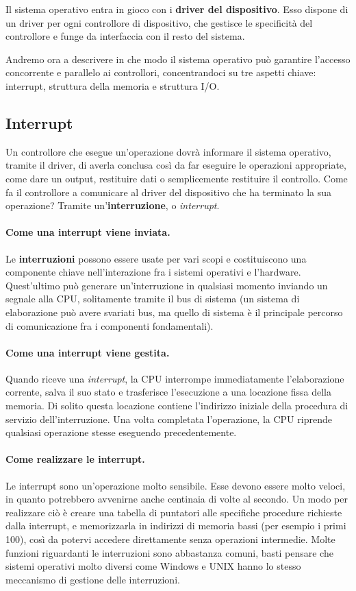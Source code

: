     Il sistema operativo entra in gioco con i \textbf{driver del dispositivo}. Esso dispone di un driver per ogni controllore di dispositivo, che gestisce le specificità del controllore e funge da interfaccia con il resto del sistema.
    
    Andremo ora a descrivere in che modo il sistema operativo può garantire l'accesso concorrente e parallelo ai controllori, concentrandoci su tre aspetti chiave: interrupt, struttura della memoria e struttura I/O.
    
    \subsection{Interrupt}
        Un controllore che esegue un'operazione dovrà informare il sistema operativo, tramite il driver, di averla conclusa così da far eseguire le operazioni appropriate, come dare un output, restituire dati o semplicemente restituire il controllo. Come fa il controllore a comunicare al driver del dispositivo che ha terminato la sua operazione? Tramite un'\textbf{interruzione}, o \textit{interrupt}.
        
        
        \paragraph{Come una interrupt viene inviata.} Le \textbf{interruzioni} possono essere usate per vari scopi e costituiscono una componente chiave nell'interazione fra i sistemi operativi e l'hardware. Quest'ultimo può generare un'interruzione in qualsiasi momento inviando un segnale alla CPU, solitamente tramite il bus di sistema (un sistema di elaborazione può avere svariati bus, ma quello di sistema è il principale percorso di comunicazione fra i componenti fondamentali).
        
        \paragraph{Come una interrupt viene gestita.} Quando riceve una \textit{interrupt}, la CPU interrompe immediatamente l'elaborazione corrente, salva il suo stato e trasferisce l'esecuzione a una locazione fissa della memoria. Di solito questa locazione contiene l'indirizzo iniziale della procedura di servizio dell'interruzione. Una volta completata l'operazione, la CPU riprende qualsiasi operazione stesse eseguendo precedentemente.
        
        \paragraph{Come realizzare le interrupt.} Le interrupt sono un'operazione molto sensibile. Esse devono essere molto veloci, in quanto potrebbero avvenirne anche centinaia di volte al secondo. Un modo per realizzare ciò è creare una tabella di puntatori alle specifiche procedure richieste dalla interrupt, e memorizzarla in indirizzi di memoria bassi (per esempio i primi 100), così da potervi accedere direttamente senza operazioni intermedie. Molte funzioni riguardanti le interruzioni sono abbastanza comuni, basti pensare che sistemi operativi molto diversi come Windows e UNIX hanno lo stesso meccanismo di gestione delle interruzioni.
        
